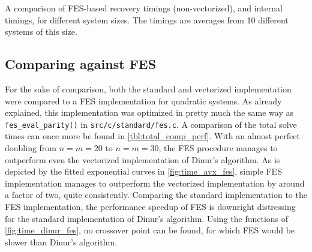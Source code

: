 \begin{table}[t]
    \begin{center}
    \end{center}
    \caption{A comparison of FES-based recovery timings (non-vectorized), and internal timings, for different system sizes. The timings are averages from 10 different systems of this size.} \label{tbl:fes_comp_perf}
\end{table}

\subsection{Comparing against FES}

For the sake of comparison, both the standard and vectorized implementation were compared to a FES implementation for quadratic systems. As already explained, this implementation was optimized in pretty much the same way as \texttt{fes\_eval\_parity()} in \texttt{src/c/standard/fes.c}. A comparison of the total solve times can once more be found in \cref{tbl:total_comp_perf}. With an almost perfect doubling from $n = m = 20$ to $n = m = 30$, the FES procedure manages to outperform even the vectorized implementation of Dinur's algorithm. As is depicted by the fitted exponential curves in \cref{fig:time_avx_fes}, simple FES implementation manages to outperform the vectorized implementation by around a factor of two, quite consistently. Comparing the standard implementation to the FES implementation, the performance speedup of FES is downright distressing for the standard implementation of Dinur's algorithm. Using the functions of \cref{fig:time_dinur_fes}, no crossover point can be found, for which FES would be slower than Dinur's algorithm.

